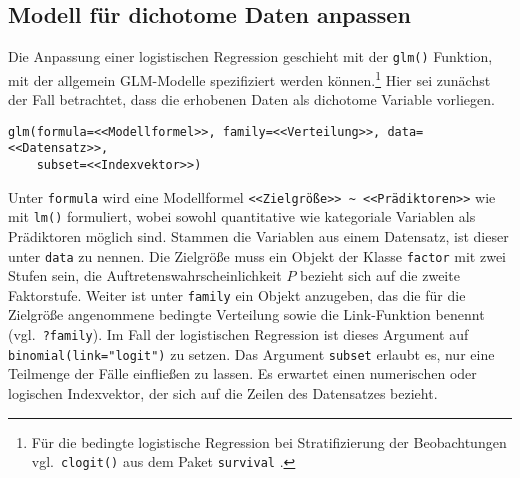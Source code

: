 \subsection{Modell für dichotome Daten anpassen}
\label{sec:glmFit}

Die Anpassung einer logistischen Regression geschieht mit der \lstinline!glm()! Funktion, mit der allgemein GLM-Modelle spezifiziert werden können.\footnote{Für die bedingte logistische Regression bei Stratifizierung der Beobachtungen vgl.\ \lstinline!clogit()! aus dem Paket  \lstinline!survival! \cite{Therneau2012a}.} Hier sei zunächst der Fall betrachtet, dass die erhobenen Daten als dichotome Variable vorliegen.
\begin{lstlisting}
glm(formula=<<Modellformel>>, family=<<Verteilung>>, data=<<Datensatz>>,
    subset=<<Indexvektor>>)
\end{lstlisting}

Unter \lstinline!formula! wird eine Modellformel \lstinline!<<Zielgröße>> ~ <<Prädiktoren>>! wie mit \lstinline!lm()! formuliert, wobei sowohl quantitative wie kategoriale Variablen als Prädiktoren möglich sind. Stammen die Variablen aus einem Datensatz, ist dieser unter \lstinline!data! zu nennen. Die Zielgröße muss ein Objekt der Klasse \lstinline!factor! mit zwei Stufen sein, die Auftretenswahrscheinlichkeit $P$ bezieht sich auf die zweite Faktorstufe. Weiter ist unter \lstinline!family! ein Objekt anzugeben, das die für die Zielgröße angenommene bedingte Verteilung sowie die Link-Funktion benennt (vgl.\ \lstinline!?family!). Im Fall der logistischen Regression ist dieses Argument auf \lstinline!binomial(link="logit")! zu setzen. Das Argument \lstinline!subset! erlaubt es, nur eine Teilmenge der Fälle einfließen zu lassen. Es erwartet einen numerischen oder logischen Indexvektor, der sich auf die Zeilen des Datensatzes bezieht.


